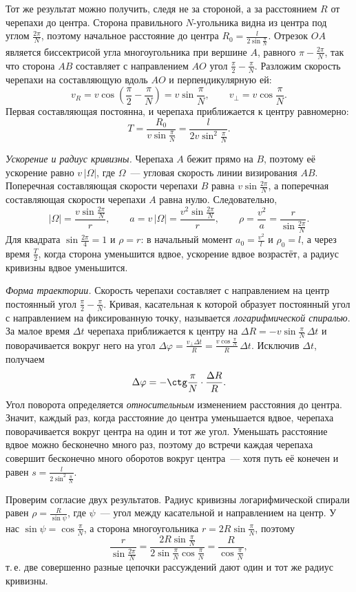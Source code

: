 \documentclass[../main.tex]{subfiles}
\begin{document}
\begin{example}
Тот же результат можно получить, следя не за стороной, а за расстоянием $R$ от
черепахи до центра. Сторона правильного $N$-угольника видна из центра под углом
$\frac{2\pi}{N}$, поэтому начальное расстояние до центра
$R_0 = \frac{l}{2\sin\frac{\pi}{N}}$. Отрезок $OA$ является биссектрисой угла
многоугольника при вершине $A$, равного $\pi - \frac{2\pi}{N}$, так что сторона $AB$
составляет с направлением $AO$ угол $\frac{\pi}{2} - \frac{\pi}{N}$. Разложим скорость
черепахи на составляющую вдоль $AO$ и перпендикулярную ей:
\[
v_R = v\cos\left(\frac{\pi}{2} - \frac{\pi}{N}\right) = v\sin\frac{\pi}{N},
\qquad
v_\perp = v\cos\frac{\pi}{N}.
\]
Первая составляющая постоянна, и черепаха приближается к центру равномерно:
\[
T = \frac{R_0}{v\sin\frac{\pi}{N}} = \frac{l}{2v\sin^2\frac{\pi}{N}}.
\]

\noindent\textit{Ускорение и радиус кривизны.} Черепаха $A$ бежит прямо на $B$,
поэтому её ускорение равно $v\,|\Omega|$, где $\Omega$~--- угловая скорость линии
визирования $AB$. Поперечная составляющая скорости черепахи $B$ равна
$v\sin\frac{2\pi}{N}$, а поперечная составляющая скорости черепахи $A$ равна нулю.
Следовательно,
\[
|\Omega| = \frac{v\sin\frac{2\pi}{N}}{r},
\qquad
a = v\,|\Omega| = \frac{v^2\sin\frac{2\pi}{N}}{r},
\qquad
\rho = \frac{v^2}{a} = \frac{r}{\sin\frac{2\pi}{N}}.
\]
Для квадрата $\sin\frac{2\pi}{4} = 1$ и $\rho = r$: в начальный момент $a_0 = \frac{v^2}{l}$
и $\rho_0 = l$, а через время $\frac{T}{2}$, когда сторона уменьшится вдвое, ускорение
вдвое возрастёт, а радиус кривизны вдвое уменьшится.

\noindent\textit{Форма траектории.} Скорость черепахи составляет с направлением на
центр постоянный угол $\frac{\pi}{2} - \frac{\pi}{N}$. Кривая, касательная к которой
образует постоянный угол с направлением на фиксированную точку, называется
\textit{логарифмической спиралью}. За малое время $\Delta t$ черепаха приближается к
центру на $\Delta R = -v\sin\frac{\pi}{N}\,\Delta t$ и поворачивается вокруг него на
угол $\Delta\varphi = \frac{v_\perp\Delta t}{R} = \frac{v\cos\frac{\pi}{N}}{R}\,\Delta t$.
Исключив $\Delta t$, получаем
\[
\Delta\varphi = -\ctg\frac{\pi}{N}\cdot\frac{\Delta R}{R}.
\]
Угол поворота определяется \emph{относительным} изменением расстояния до центра.
Значит, каждый раз, когда расстояние до центра уменьшается вдвое, черепаха
поворачивается вокруг центра на один и тот же угол. Уменьшать расстояние вдвое можно
бесконечно много раз, поэтому до встречи каждая черепаха совершит бесконечно много
оборотов вокруг центра~--- хотя путь её конечен и равен
$s = \frac{l}{2\sin^2\frac{\pi}{N}}$.

Проверим согласие двух результатов. Радиус кривизны логарифмической спирали равен
$\rho = \frac{R}{\sin\psi}$, где $\psi$~--- угол между касательной и направлением на
центр. У нас $\sin\psi = \cos\frac{\pi}{N}$, а сторона многоугольника
$r = 2R\sin\frac{\pi}{N}$, поэтому
\[
\frac{r}{\sin\frac{2\pi}{N}} = \frac{2R\sin\frac{\pi}{N}}{2\sin\frac{\pi}{N}\cos\frac{\pi}{N}}
= \frac{R}{\cos\frac{\pi}{N}},
\]
т.\,е. две совершенно разные цепочки рассуждений дают один и тот же радиус кривизны.
\end{example}
\end{document}
